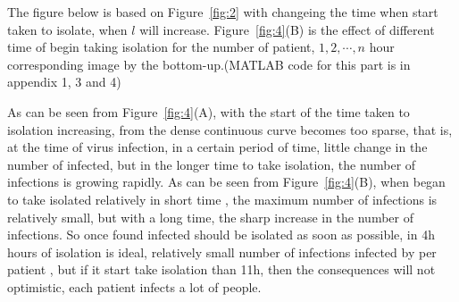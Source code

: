 The figure below is based on Figure~\ref{fig:2} with changeing
the time when start taken to isolate, when $l$ will increase.
Figure~\ref{fig:4}(B) is the effect of different time of begin taking 
isolation for the number of patient, $1,2,\cdots,n$ hour
corresponding image by the bottom-up.(MATLAB code for this part
is in appendix 1, 3 and 4)\par
As can be seen from Figure~\ref{fig:4}(A), with the start of
the time taken to isolation increasing, from the dense
continuous curve becomes too sparse, that is, at the time of
virus infection, in a certain period of time, little change in
the number of infected, but in the longer time to take
isolation, the number of infections is growing rapidly.
As can be seen from Figure~\ref{fig:4}(B), when began to take
isolated relatively in short time , the maximum number of
infections is relatively small, but with a long time, the sharp
increase in the number of infections. So once found infected
should be isolated as soon as possible, in 4h hours of isolation
is ideal, relatively small number of infections infected by per
patient \cite{bib3}, but if it start take isolation than 11h,
then the consequences will not optimistic, each patient infects
a lot of people.


